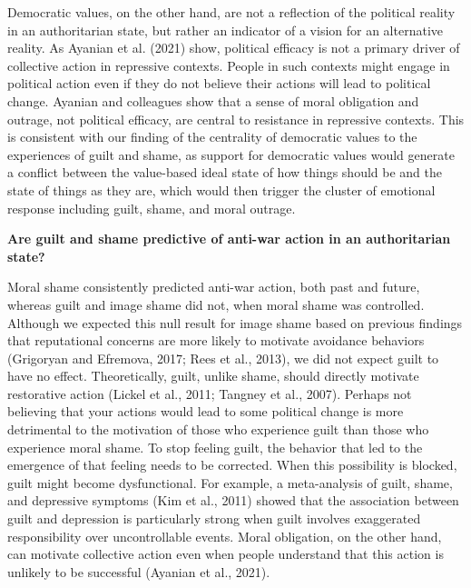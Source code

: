 \documentclass[
]{article}
\begin{document}
Democratic values, on the other hand, are not a reflection of the political reality in an authoritarian state, but rather an indicator of a vision for an alternative reality. As Ayanian et al. (2021) show, political efficacy is not a primary driver of collective action in repressive contexts. People in such contexts might engage in political action even if they do not believe their actions will lead to political change. Ayanian and colleagues show that a sense of moral obligation and outrage, not political efficacy, are central to resistance in repressive contexts. This is consistent with our finding of the centrality of democratic values to the experiences of guilt and shame, as support for democratic values would generate a conflict between the value-based ideal state of how things should be and the state of things as they are, which would then trigger the cluster of emotional response including guilt, shame, and moral outrage.

\textbf{Are guilt and shame predictive of anti-war action in an authoritarian state?}

Moral shame consistently predicted anti-war action, both past and future, whereas guilt and image shame did not, when moral shame was controlled. Although we expected this null result for image shame based on previous findings that reputational concerns are more likely to motivate avoidance behaviors (Grigoryan and Efremova, 2017; Rees et al., 2013), we did not expect guilt to have no effect. Theoretically, guilt, unlike shame, should directly motivate restorative action (Lickel et al., 2011; Tangney et al., 2007). Perhaps not believing that your actions would lead to some political change is more detrimental to the motivation of those who experience guilt than those who experience moral shame. To stop feeling guilt, the behavior that led to the emergence of that feeling needs to be corrected. When this possibility is blocked, guilt might become dysfunctional. For example, a meta-analysis of guilt, shame, and depressive symptoms (Kim et al., 2011) showed that the association between guilt and depression is particularly strong when guilt involves exaggerated responsibility over uncontrollable events. Moral obligation, on the other hand, can motivate collective action even when people understand that this action is unlikely to be successful (Ayanian et al., 2021).
\end{document}
